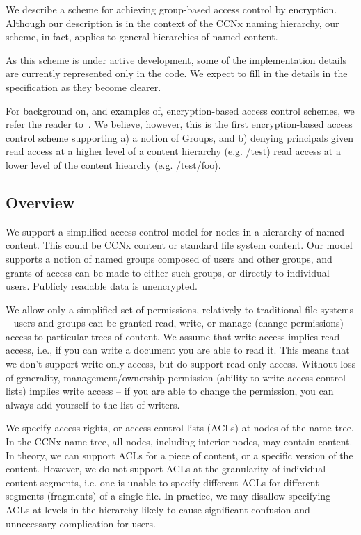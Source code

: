 We describe a scheme for achieving group-based access control by
encryption. Although our description is in the context of the CCNx
naming hierarchy, our scheme, in fact, applies to general hierarchies
of named content.

As this scheme is under active development, some of the implementation
details are currently represented only in the code. We expect to fill
in the details in the specification as they become clearer.

For background on, and examples of, encryption-based access control
schemes, we refer the reader to~\cite{At2005,cryptree}. We believe, however,
this is the first encryption-based access control scheme supporting a)
a notion of Groups, and b) denying principals given read access at
a higher level of a content hierarchy (e.g. /test) read access at a
lower level of the content hiearchy (e.g. /test/foo).

\subsection{Overview}

We support a simplified access control model for nodes in a hierarchy
of named content. This could be CCNx content or standard file system
content. Our model supports a notion of named groups composed of users
and other groups, and grants of access can be made to either such
groups, or directly to individual users. Publicly readable data is
unencrypted.

We allow only a simplified set of permissions, relatively to
traditional file systems -- users and groups can be granted read,
write, or manage (change permissions) access to particular trees of
content. We assume that write access implies read access, i.e., if you
can write a document you are able to read it. This means that we don't
support write-only access, but do support read-only access. Without
loss of generality, management/ownership permission (ability to write
access control lists) implies write access -- if you are able to
change the permission, you can always add yourself to the list of
writers.

We specify access rights, or access control lists (ACLs) at nodes of
the name tree. In the CCNx name tree, all nodes, including interior
nodes, may contain content. In theory, we can support ACLs for a piece
of content, or a specific version of the content. However, we do not
support ACLs at the granularity of individual content segments,
i.e. one is unable to specify different ACLs for different segments
(fragments) of a single file. In practice, we may disallow specifying
ACLs at levels in the hierarchy likely to cause significant confusion
and unnecessary complication for users.

